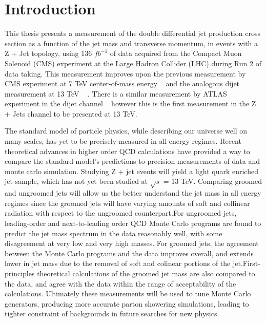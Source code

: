 
\chapter{Introduction}

This thesis presents a measurement of the double differential jet production cross section as a function of the jet mass and transverse momentum, in events with a Z + Jet topology, using 136 $fb^{-1}$ of data acquired from the Compact Muon Solenoid (CMS) experiment at the Large Hadron Collider (LHC) during Run 2 of data taking. This measurement improves upon the previous measurement by CMS experiment at 7 TeV center-of-mass energy ~\cite{Chatrchyan:2013vbb} and the analogous dijet measurement at 13 TeV ~\cite{Sirunyan:2018xdh} . There is a similar measurement by ATLAS experiment in the dijet channel ~\cite{Aaboud:2017qwh} however this is the first measurement in the Z + Jets channel to be presented at 13 TeV. %


The standard model of particle physics, while describing our universe well on many scales, has yet to be precisely measured in all energy regimes. Recent theoretical advances in higher order QCD calculations have provided a way to compare the standard model's predictions to precision measurements of data and monte carlo simulation.  Studying Z + jet events will yield a light quark enriched jet sample, which has not yet been studied at $\sqrt{s}$ = 13 TeV. Comparing groomed and ungroomed jets will allow us the better understand the jet mass in all energy regimes since the groomed jets will have varying amounts of soft and collinear radiation with respect to the ungroomed counterpart.For ungroomed jets, leading-order and next-to-leading order QCD Monte Carlo programs are found to predict the jet mass spectrum in the data reasonably well, with some disagreement at very low and very high masses. For groomed jets, the agreement between the Monte Carlo programs and the data improves overall, and extends lower in jet mass due to the removal of soft and colinear portions of the jet.First-principles theoretical calculations of the groomed jet mass are also compared to the data, and agree with the data within the range of acceptability of the calculations. Ultimately these measurements will be used to tune Monte Carlo generators, producing more accurate parton showering simulations, leading to tighter constraint of backgrounds in future searches for new physics.